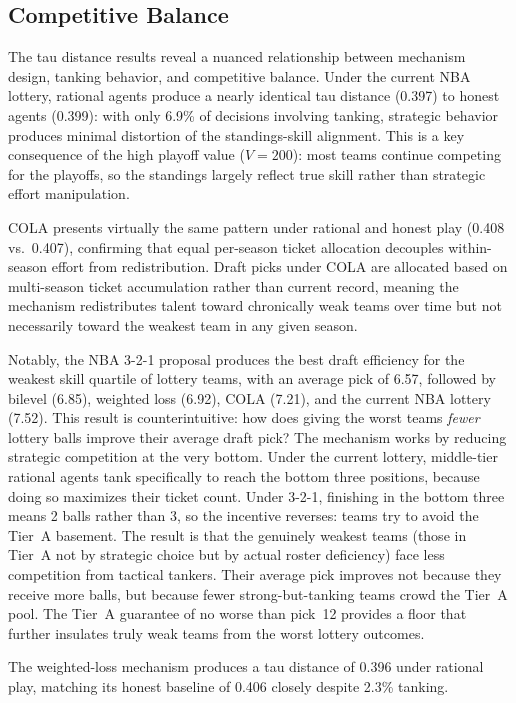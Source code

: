 \documentclass{article}
\begin{document}
\subsection{Competitive Balance}

The tau distance results reveal a nuanced relationship between mechanism
design, tanking behavior, and competitive balance.
Under the current NBA lottery, rational agents produce a nearly identical tau
distance (0.397) to honest agents (0.399): with only 6.9\% of decisions
involving tanking, strategic behavior produces minimal distortion of the
standings-skill alignment.
This is a key consequence of the high playoff value ($V = 200$): most teams
continue competing for the playoffs, so the standings largely reflect true
skill rather than strategic effort manipulation.

COLA presents virtually the same pattern under rational and honest play
(0.408 vs.\ 0.407), confirming that equal per-season ticket allocation
decouples within-season effort from redistribution.
Draft picks under COLA are allocated based on multi-season ticket accumulation
rather than current record, meaning the mechanism redistributes talent toward
chronically weak teams over time but not necessarily toward the weakest team
in any given season.

Notably, the NBA 3-2-1 proposal produces the best draft efficiency for the
weakest skill quartile of lottery teams, with an average pick of 6.57,
followed by bilevel (6.85), weighted loss (6.92), COLA (7.21), and the
current NBA lottery (7.52).
This result is counterintuitive: how does giving the worst teams \emph{fewer}
lottery balls improve their average draft pick?
The mechanism works by reducing strategic competition at the very bottom.
Under the current lottery, middle-tier rational agents tank specifically to
reach the bottom three positions, because doing so maximizes their ticket
count.
Under 3-2-1, finishing in the bottom three means 2 balls rather than 3,
so the incentive reverses: teams try to avoid the Tier~A basement.
The result is that the genuinely weakest teams (those in Tier~A not by
strategic choice but by actual roster deficiency) face less competition from
tactical tankers.
Their average pick improves not because they receive more balls, but because
fewer strong-but-tanking teams crowd the Tier~A pool.
The Tier~A guarantee of no worse than pick~12 provides a floor that further
insulates truly weak teams from the worst lottery outcomes.

The weighted-loss mechanism produces a tau distance of 0.396 under rational
play, matching its honest baseline of 0.406 closely despite 2.3\% tanking.
\end{document}
